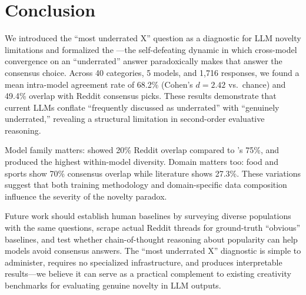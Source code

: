 \section{Conclusion}
\label{sec:conclusion}

We introduced the ``most underrated X'' question as a diagnostic for LLM novelty limitations and formalized the \noveltyparadox---the self-defeating dynamic in which cross-model convergence on an ``underrated'' answer paradoxically makes that answer the consensus choice. Across 40 categories, 5 models, and 1,716 responses, we found a mean intra-model agreement rate of 68.2\% (Cohen's $d = 2.42$ vs.\ chance) and 49.4\% overlap with Reddit consensus picks. These results demonstrate that current LLMs conflate ``frequently discussed as underrated'' with ``genuinely underrated,'' revealing a structural limitation in second-order evaluative reasoning.

Model family matters: \llama showed 20\% Reddit overlap compared to \gptfour's 75\%, and \qwen produced the highest within-model diversity. Domain matters too: food and sports show 70\% consensus overlap while literature shows 27.3\%. These variations suggest that both training methodology and domain-specific data composition influence the severity of the novelty paradox.

Future work should establish human baselines by surveying diverse populations with the same questions, scrape actual Reddit threads for ground-truth ``obvious'' baselines, and test whether chain-of-thought reasoning about popularity can help models avoid consensus answers. The ``most underrated X'' diagnostic is simple to administer, requires no specialized infrastructure, and produces interpretable results---we believe it can serve as a practical complement to existing creativity benchmarks for evaluating genuine novelty in LLM outputs.
